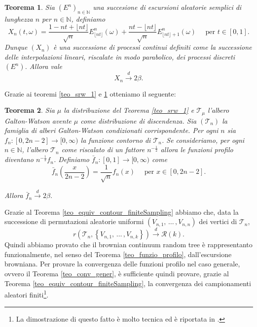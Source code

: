 \documentclass[11pt, twoside]{report}
\newcommand{\Rr}{\mathscr{R}}
\newcommand{\Tt}{\mathscr{T}}
\theoremstyle{definition}
\theoremstyle{plain}
\newtheorem{teo}{Teorema}[chapter]
\theoremstyle{remark}
\numberwithin{equation}{chapter}
\begin{document}
\begin{teo}\label{teo_srw_2}
Sia $(E^n)_{n\in \mathbb{N}}$ una succesione di escursioni aleatorie semplici di lunghezza $n$ per $n\in \mathbb{N}$, definiamo
\begin{equation}
X_n(t,\omega)=\frac{1-nt+\lfloor nt \rfloor}{\sqrt{n}}E^n_{\lfloor nt \rfloor}(\omega)+\frac{nt - \lfloor nt \rfloor}{\sqrt n}E^n_{ \lfloor nt \rfloor +1 }(\omega) \quad \text{ per } t\in[0,1].
\end{equation}
Dunque $\left(X_n\right)$ è una successione di processi continui definiti come la successione delle interpolazioni lineari, riscalate in modo parabolico, dei processi discreti $(E^n)$. Allora vale 
$$X_n\xrightarrow{d} 2\beta.$$
\end{teo}

Grazie ai teoremi \ref{teo_srw_1} e \ref{teo_srw_2} otteniamo il seguente:
\begin{teo}
Sia $\mu$ la distribuzione del Teorema \ref{teo_srw_1} e $\Tt_{\mu}$ l'albero Galton-Watson avente $\mu$ come distribuzione di discendenza. Sia $\left(\Tt_n\right)$ la famiglia di alberi Galton-Watson condizionati corrispondente. Per ogni $n$ sia $f_n:[0,2n-2]\longrightarrow [0,\infty )$ la funzione contorno di $\Tt_n$. Se consideriamo, per ogni $n\in\mathbb{N}$, l'albero $\Tt_n$ come riscalato di un fattore $n^{-\frac{1}{2}}$ allora le funzioni profilo diventano
$ n^{-\frac{1}{2}} f_n$. Definiamo $\bar{f}_n:[0,1]\longrightarrow[0,\infty)$ come 
$$\bar{f}_n\left(\frac{x}{2n-2}\right)=\frac{1}{\sqrt{n}}f_n\left(x\right) \quad \text{ per } x\in[0,2n-2].$$

Allora $\bar{f}_n\xrightarrow{d} 2\beta$.

\end{teo}

Grazie al Teorema \ref{teo_equiv_contour_finiteSampling} abbiamo che, data la successione di permutazioni aleatorie uniformi $\left(V_{n,1}, \, \dots \, ,V_{n,n}\right)$ dei vertici di $\Tt_n$,
$$r\left(\Tt_n, \left\{V_{n,1}, \, \dots \, ,V_{n,k}\right\}\right)\xrightarrow{d} \Rr(k).$$
Quindi abbiamo provato che il brownian continuum random tree è  rappresentanto funzionalmente, nel senso del Teorema \ref{teo_funzio_profilo}, dall'escursione browniana.
Per provare la convergenza delle funzioni profilo nel caso generale, ovvero il Teorema \ref{teo_conv_gener}, è sufficiente quindi provare, grazie al Teorema \ref{teo_equiv_contour_finiteSampling}, la convergenza dei campionamenti aleatori finiti\footnote{La dimostrazione di questo fatto è molto tecnica ed è riportata in \cite{Ald3}.}.
\end{document}
